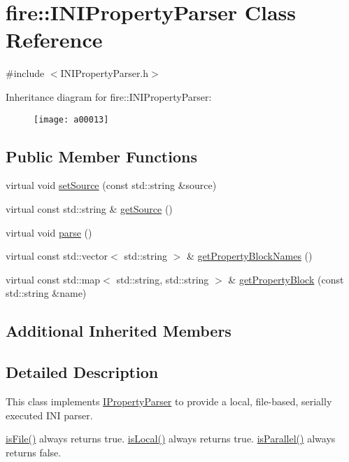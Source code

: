 \hypertarget{a00013}{}\section{fire\+:\+:I\+N\+I\+Property\+Parser Class Reference}
\label{a00013}


{\ttfamily \#include $<$I\+N\+I\+Property\+Parser.\+h$>$}

Inheritance diagram for fire\+:\+:I\+N\+I\+Property\+Parser\+:\begin{figure}[H]
\begin{center}
\leavevmode
\texttt{[image: a00013]}
\end{center}
\end{figure}
\subsection*{Public Member Functions}
\begin{DoxyCompactItemize}
\item 
virtual void \hyperlink{a00013_a06793909bc707a69d0c5772b14bc946d}{set\+Source} (const std\+::string \&source)
\item 
virtual const std\+::string \& \hyperlink{a00013_ad02c9a530f20a706d7bb2554813e8d3a}{get\+Source} ()
\item 
virtual void \hyperlink{a00013_a31b6bad01e65ed4bb5f1ba297616c641}{parse} ()
\item 
virtual const std\+::vector$<$ std\+::string $>$ \& \hyperlink{a00013_aed0f1f47111794659564dcddb4d25bc6}{get\+Property\+Block\+Names} ()
\item 
virtual const std\+::map$<$ std\+::string, std\+::string $>$ \& \hyperlink{a00013_a3591312590a66659ebd377cdde9ab9ad}{get\+Property\+Block} (const std\+::string \&name)
\end{DoxyCompactItemize}
\subsection*{Additional Inherited Members}


\subsection{Detailed Description}
This class implements \hyperlink{a00015}{I\+Property\+Parser} to provide a local, file-\/based, serially executed I\+NI parser.

\hyperlink{a00012_a091d5cf56bf8f407854ef87f460b2958}{is\+File()} always returns true. \hyperlink{a00012_a770acae6e216de3a9c7140a12de25d58}{is\+Local()} always returns true. \hyperlink{a00012_ad46898c516adcce38acbb4800dc9777b}{is\+Parallel()} always returns false.

